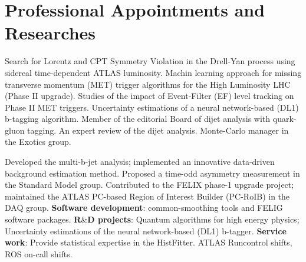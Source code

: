 \section{Professional Appointments and Researches}

\begin{cventries}
\end{cventries}
      \vspace{-1cm}
      \parbox{0.9\linewidth}{
      \leftskip=0.5in
       Search for Lorentz and  CPT Symmetry Violation in the Drell-Yan process using 
       sidereal time-dependent ATLAS luminosity. Machin learning approach for missing transverse momentum (MET) trigger algorithms for the High Luminosity LHC (Phase II upgrade). Studies of the impact of Event-Filter (EF) level tracking on Phase II MET triggers.\newline
        Uncertainty estimations of a neural network-based (DL1) b-tagging algorithm.\newline
        Member of the editorial Board of dijet analysis with quark-gluon tagging. 
        An expert review of the dijet analysis. \newline
        Monte-Carlo manager in the Exotics group.
        }
 
 \begin{cventries}   
  \end{cventries}
  \vspace{-1cm}
   \parbox{0.9\linewidth}{
      \leftskip=0.5in
       Developed the multi-b-jet analysis; implemented an innovative data-driven background
       estimation method. Proposed a time-odd asymmetry measurement in the Standard Model group. \newline
        Contributed to the FELIX phase-1 upgrade project; maintained the ATLAS PC-based Region of 
        Interest Builder (PC-RoIB) in the DAQ group. \newline
        \textbf{Software development}: common-smoothing tools and FELIG software packages. \newline
        \textbf{R$\&$D projects}: Quantum algorithms for high energy physics; Uncertainty estimations 
        of the neural network-based (DL1) b-tagger. \newline
        \textbf{Service work}: Provide statistical expertise in the HistFitter. ATLAS Runcontrol shifts,
        ROS on-call shifts.
    }
    

